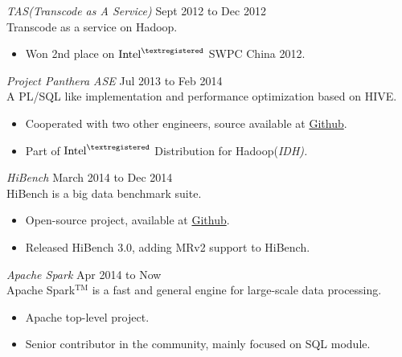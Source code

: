 \documentclass[line,margin]{res}
\begin{document}
\begin{resume}
                {\sl TAS(Transcode as A Service)} \hfill        Sept 2012 to Dec 2012\\
                Transcode as a service on Hadoop.
                  \begin{itemize}
                   \item Won 2nd place on $\textrm{Intel}^{\textregistered}$ SWPC China 2012.
                   \end{itemize}
                   
                {\sl Project Panthera ASE} \hfill        Jul 2013 to Feb 2014\\
                A PL/SQL like implementation and performance optimization based on HIVE.
                  \begin{itemize}
                   \item Cooperated with two other engineers, source available at \href{https://github.com/intel-hadoop/project-panthera}{Github}.
                   \item Part of $\textrm{Intel}^{\textregistered}$ Distribution for Hadoop(\sl IDH).
                   \end{itemize}

                {\sl HiBench} \hfill        March 2014 to Dec 2014\\
                HiBench is a big data benchmark suite.
                  \begin{itemize}
                   \item Open-source project, available at \href{https://github.com/intel-hadoop/HiBench}{Github}.
                   \item Released HiBench 3.0, adding MRv2 support to HiBench.
                   \end{itemize}

                {\sl Apache Spark} \hfill        Apr 2014 to Now\\
                Apache Spark$^{\textrm{TM}}$ is a fast and general engine for large-scale data processing.
                  \begin{itemize}
                   \item Apache top-level project.
                   \item Senior contributor in the community, mainly focused on SQL module.
                   \end{itemize}


\end{resume}
\end{document}
